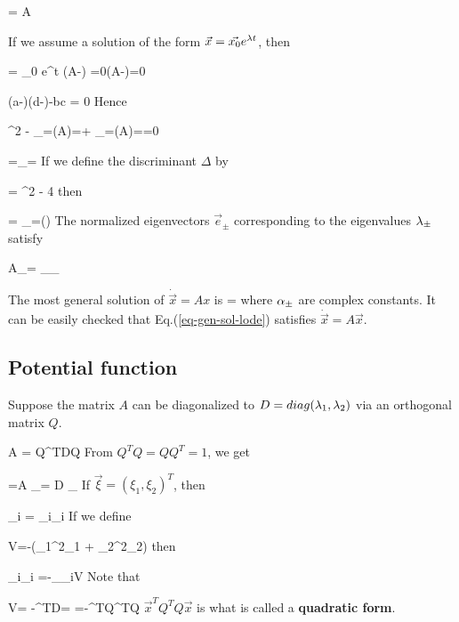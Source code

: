 \beq
{} = A 
\eeq


If we assume a solution of the form $\vec{x}=\vec{x_0}
e^{\lambda t}$, then


\beq 
{}= _0 e^{\lam t}
\implies 
(A-\lam)  =0\implies \det(A-\lam)=0
\eeq

\beq
 (a-\lam)(d-\lam)-bc = 0
\eeq
Hence

\beq
\lam^2 - 
_{=\tr(A)=\tau}\lam + 
_{=\det(A)=\delta}=0
\eeq

\beq
\lam =\lam_{\pm}=
\eeq
If we define the discriminant $\Delta$ by

\beq
\Delta = \tau^2 - 4 \delta
\eeq
then

\beq
\lam = \lam_\pm =(\tau\pm \sqrt{\Delta})
\eeq
The normalized eigenvectors $\vec{e}_\pm$ corresponding
to the eigenvalues $\lambda_\pm$ satisfy

\beq 
A_\pm = \lam_{\pm}_\pm
\eeq


The most general solution 
of $\dot{\vec{x}}=A x$ is
\beq
{} = 
\Re{}
\label{eq-gen-sol-lode}
\eeq
where $\alpha_\pm$ are complex constants. It can be easily checked that
Eq.(\ref{eq-gen-sol-lode}) satisfies $\dot{\vec{x}} = A \vec{x}$.

\subsection{Potential function}

Suppose the matrix $A$ can be diagonalized to $D=diag(\lambda_1, \lambda_2)$
via an orthogonal matrix $Q$.

\beq
A = Q^TDQ
\eeq
From $Q^TQ=QQ^T=1$, we get

\beq
{}=A
\implies
{}_{\ddot{\vec{\xi}}}= D _{\vec{\xi}}
\eeq
If $\vec{\xi} = (\xi_1, \xi_2)^T$,
then

\beq
\ddot{\xi}_i = \lam_i\xi_i\quad {}
\eeq
If we define

\beq
V=-(\lam_1\xi^2_1 + \lam_2\xi^2_2)
\eeq
then

\beq
\lam_i\xi_i =-\partial_{\xi_i}V \quad {}
\eeq
Note that

\beq
V=
-\vec{\xi}^TD\vec{\xi}=
=-^TQ^TQ
\eeq
$\vec{x}^TQ^TQ\vec{x}$ is what is called a
{\bf quadratic form}.




